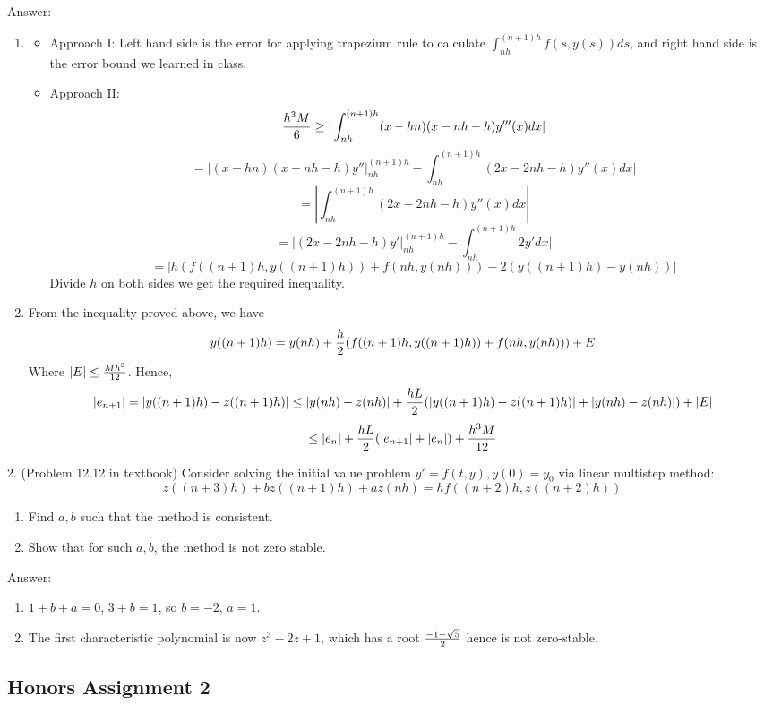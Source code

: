 \documentclass[20pt]{article} %
\theoremstyle{break}
\begin{document}
Answer:

\begin{enumerate}
\item\begin{itemize}
  \item Approach I: Left hand side is the error for applying trapezium rule to calculate $\int_{nh}^{(n+1)h}f(s, y(s))ds$, and right hand side is the error bound we learned in class.
  \item Approach II:
    \[{h^3M\over 6}\geq |\int_{nh}^{(n+1)h}(x-hn)(x-nh-h)y'''(x)dx|\]
    \[=|(x-hn)(x-nh-h)y''|_{nh}^{(n+1)h}-\int_{nh}^{(n+1)h}(2x-2nh-h)y''(x)dx|\]
    \[=|\int_{nh}^{(n+1)h}(2x-2nh-h)y''(x)dx|\]
    \[=|(2x-2nh-h)y'|_{nh}^{(n+1)h}-\int_{nh}^{(n+1)h}2y'dx|\]
    \[=|h(f((n+1)h, y((n+1)h))+f(nh, y(nh)))-2(y((n+1)h)-y(nh))|\]
    Divide $h$ on both sides we get the required inequality.
    
   \end{itemize}
 \item From the inequality proved above, we have
   \[y((n+1)h)=y(nh)+{h\over 2}(f((n+1)h, y((n+1)h))+f(nh, y(nh)))+E\]
   Where $|E|\leq {Mh^3\over 12}$. Hence,
   \[|e_{n+1}|=|y((n+1)h)-z((n+1)h)|\leq |y(nh)-z(nh)|+{hL\over 2}(|y((n+1)h)-z((n+1)h)|+|y(nh)-z(nh)|)+|E|\]
   \[\leq |e_n|+{hL\over 2}(|e_{n+1}|+|e_n|)+{h^3M\over 12}\]
\end{enumerate}

2. (Problem 12.12 in textbook) Consider solving the initial value problem $y'=f(t, y), y(0)=y_0$ via linear multistep method:
\[z((n+3)h)+bz((n+1)h)+az(nh)=hf((n+2)h, z((n+2)h))\]
\begin{enumerate}
\item Find $a, b$ such that the method is consistent.
\item Show that for such $a, b$, the method is not zero stable.
\end{enumerate}

Answer:
\begin{enumerate}
\item $1+b+a=0$, $3+b=1$, so $b=-2$, $a=1$.
\item The first characteristic polynomial is now $z^3-2z+1$, which has a root ${-1-\sqrt{5}\over 2}$ hence is not zero-stable.
\end{enumerate}

\subsection{Honors Assignment 2}
\end{document}
